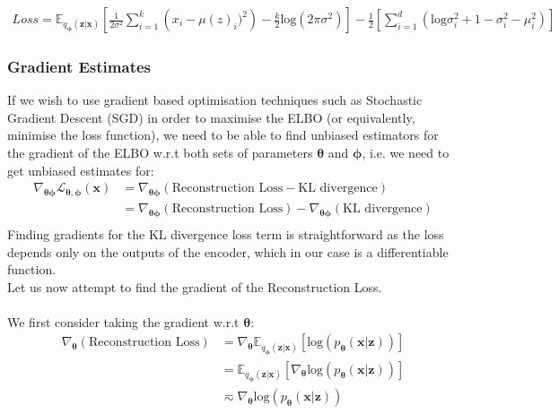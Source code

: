 \documentclass{article}
\theoremstyle{definition}
\begin{document}
\begin{align}
    Loss = \mathbb{E}_{q_{\boldsymbol{\phi}}(\mathbf{z}|\mathbf{x})}\left[\frac{1}{2\sigma^2}\sum_{i=1}^{k}\left(x_i-\mu(z)_i)^2\right)-\frac{k}{2}\text{log}(2\pi\sigma^2)\right] -\frac{1}{2}\left[\sum_{i=1}^d\left(\text{log}\sigma_i^2 + 1 -\sigma_i^2-\mu_i^2\right)\right] 
\end{align}

\subsubsection{Gradient Estimates}
If we wish to use gradient based optimisation techniques such as Stochastic Gradient Descent (SGD) in order to maximise the ELBO (or equivalently, minimise the loss function), we need to be able to find unbiased estimators for the gradient of the ELBO w.r.t both sets of parameters $\boldsymbol{\theta}$ and $\boldsymbol{\phi}$, i.e. we need to get unbiased estimates for:
\begin{align}
\nabla_{\boldsymbol{\theta} \boldsymbol{\phi}}\mathcal{L}_{\boldsymbol{\theta}, \boldsymbol{\phi}}({\mathbf{x}}) &= \nabla_{\boldsymbol{\theta}\boldsymbol{\phi}} \left(\text{Reconstruction Loss}-\text{KL divergence}\right)\\
    &=\nabla_{\boldsymbol{\theta}\boldsymbol{\phi}} \left(\text{Reconstruction Loss}\right)-\nabla_{\boldsymbol{\theta}\boldsymbol{\phi}}\left(\text{KL divergence}\right)\\
\end{align}
Finding gradients for the KL divergence loss term is straightforward as the loss depends only on the outputs of the encoder, which in our case is a differentiable function.\\
Let us now attempt to find the gradient of the Reconstruction Loss.\\\\
We first consider taking the gradient w.r.t $\boldsymbol{\theta}$:
\begin{align}
    \nabla_{\boldsymbol{\theta}} \left(\text{Reconstruction Loss}\right) &=  \nabla_{\boldsymbol{\theta}} \mathbb{E}_{q_{\boldsymbol{\phi}}(\mathbf{z}|\mathbf{x})}\left[\text{log}\left(p_{\boldsymbol{\theta}}(\mathbf{x}| \mathbf{z})\right)\right]\\
    \label{preMC}
    &=\mathbb{E}_{q_{\boldsymbol{\phi}}(\mathbf{z}|\mathbf{x})}\left[\nabla_{\boldsymbol{\theta}}\text{log}\left(p_{\boldsymbol{\theta}}(\mathbf{x}| \mathbf{z})\right)\right]\\
    \label{unbiasedMCestimate}
    &\eqsim \nabla_{\boldsymbol{\theta}}\text{log}\left(p_{\boldsymbol{\theta}}(\mathbf{x}| \mathbf{z})\right)
\end{align}    
\end{document}
